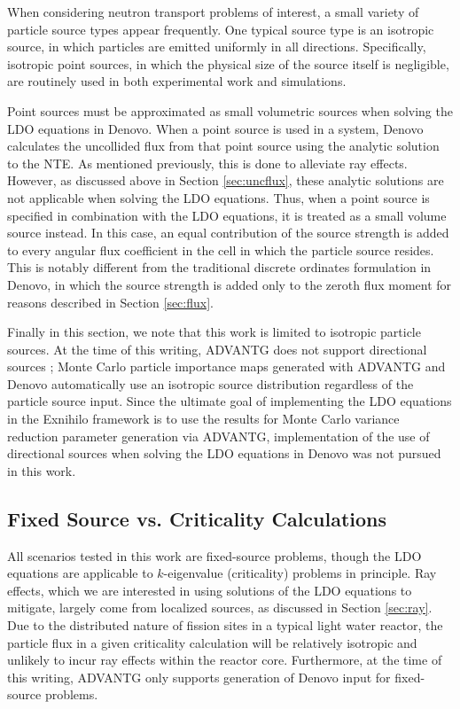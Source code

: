 When considering neutron transport problems of interest, a small variety of particle 
source types appear frequently. One typical source type is an isotropic source, in 
which particles are emitted uniformly in all directions. Specifically, isotropic point 
sources, in which the physical size of the source itself is negligible, are routinely 
used in both experimental work and simulations.

Point sources must be approximated as small volumetric sources when solving the LDO
equations in Denovo. When a point source is used in a system, Denovo calculates the
uncollided flux from that point source using the analytic solution to the NTE. As
mentioned previously, this is done to alleviate ray effects. However, as discussed 
above in Section \ref{sec:uncflux}, these analytic solutions are not applicable when
solving the LDO equations. Thus, when a point source is specified in combination with 
the LDO equations, it is treated as a small volume source instead. In this case, an
equal contribution of the source strength is added to every angular flux coefficient in
the cell in which the particle source resides. This is notably different from the
traditional discrete ordinates formulation in Denovo, in which the source strength is
added only to the zeroth flux moment for reasons described in Section \ref{sec:flux}.

Finally in this section, we note that this work is limited to isotropic particle
sources. At the time of this writing, ADVANTG does not support directional sources 
\cite{munk}; Monte Carlo particle importance maps generated with ADVANTG and Denovo
automatically use an isotropic source distribution regardless of the particle source
input. Since the ultimate goal of implementing the LDO equations in the Exnihilo
framework is to use the results for Monte Carlo variance reduction parameter 
generation via ADVANTG, implementation of the use of directional sources when solving 
the LDO equations in Denovo was not pursued in this work.

\subsection{Fixed Source vs. Criticality Calculations}

All scenarios tested in this work are fixed-source problems, though the LDO equations
are applicable to $k$-eigenvalue (criticality) problems in principle. Ray effects,
which we are interested in using solutions of the LDO equations to mitigate, largely
come from localized sources, as discussed in Section \ref{sec:ray}. Due to the 
distributed nature of fission sites in a typical light water reactor, the particle 
flux in a given criticality calculation will be relatively isotropic and unlikely to 
incur ray effects within the reactor core. Furthermore, at the time of this writing, 
ADVANTG only supports generation of Denovo input for fixed-source problems. 
